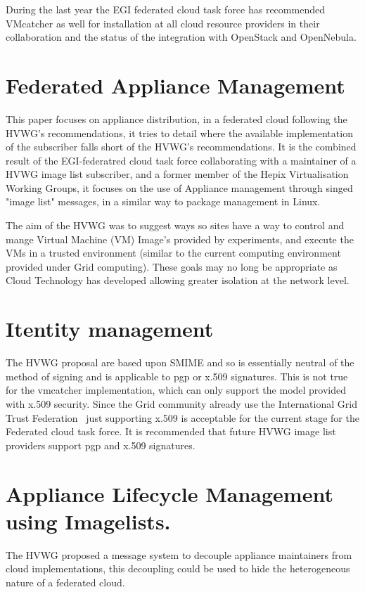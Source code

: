 \documentclass{llncs_Ibergrid2013}
\begin{document}
During the last year the EGI federated cloud task force has recommended VMcatcher as well for installation at all cloud resource providers in their collaboration and the status of the integration with OpenStack and OpenNebula.

\section{Federated Appliance Management}
\label{sect-fedimagemanagement}

This paper focuses on appliance distribution, in a federated cloud following the HVWG's recommendations, it tries to detail where the available implementation of the subscriber falls short of the HVWG's recommendations. It is the combined result of the EGI-federatred cloud task force collaborating with a maintainer of a HVWG image list subscriber, and a former member of the Hepix Virtualisation Working Groups, it focuses on the use of Appliance management through singed "image list" messages, in a similar way to package management in Linux.

The aim of the HVWG was to suggest ways so sites have a way to control and mange Virtual Machine (VM) Image's provided by experiments, and execute the VMs in a trusted environment (similar to the current computing environment provided under Grid computing). These goals may no long be appropriate as Cloud Technology has developed allowing greater isolation at the network level.
\section{Itentity management}
\label{sect-fedimagemanagement}
The HVWG proposal are based upon SMIME and so is essentially neutral of the method of signing and is applicable to pgp or x.509 signatures. This is not true for the vmcatcher implementation, which can only support the model provided with x.509 security. Since the Grid community already use the International Grid Trust Federation~\cite{igtf} just supporting x.509 is acceptable for the current stage for the Federated cloud task force. It is recommended that future HVWG image list providers support pgp and x.509 signatures.

\section{Appliance Lifecycle Management using Imagelists.}
\label{sect-appliancelifecycle}

The HVWG proposed a message system to decouple appliance maintainers from cloud implementations, this decoupling could be used to hide the heterogeneous nature of a federated cloud.
\end{document}
